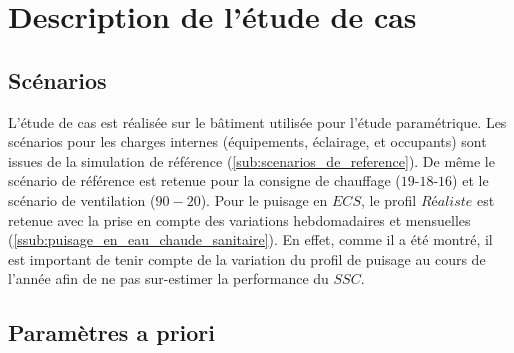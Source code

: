 





\section{Description de l’étude de cas} %
\label{sec:description_de_l_etude_de_cas}
\subsection{Scénarios} %
\label{sub:scenarios}
L’étude de cas est réalisée sur le bâtiment utilisée pour l’étude paramétrique.
Les scénarios pour les charges internes (équipements, éclairage, et occupants) sont
issues de la simulation de référence (\ref{sub:scenarios_de_reference}). De même
le scénario de référence est retenue pour la consigne de chauffage ($19$-$18$-$16$)
et le scénario de ventilation ($90-20$).
Pour le puisage en $ECS$, le profil $Réaliste$ est retenue avec la prise en compte des
variations hebdomadaires et mensuelles (\ref{ssub:puisage_en_eau_chaude_sanitaire}).
En effet, comme il a été montré, il est important de tenir compte de la variation
du profil de puisage au cours de l’année afin de ne pas sur-estimer la performance
du $SSC$.



\subsection{Paramètres a priori} %
\label{sub:parametres_a_priori}
~


